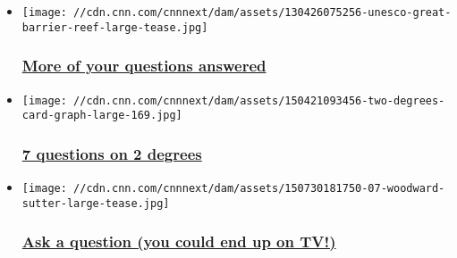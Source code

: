 \begin{itemize}
\item
  \href{/2015/09/11/opinions/your-climate-questions-two-degrees/index.html}{}

  \texttt{[image: //cdn.cnn.com/cnnnext/dam/assets/130426075256-unesco-great-barrier-reef-large-tease.jpg]}

  \hypertarget{more-of-your-questions-answered}{%
  \subsubsection{\texorpdfstring{\href{/2015/09/11/opinions/your-climate-questions-two-degrees/index.html}{More
  of your questions
  answered}}{More of your questions answered}}\label{more-of-your-questions-answered}}
\end{itemize}

\begin{itemize}
\item
  \href{/2015/04/24/opinions/sutter-questions-two-degrees-climate/index.html}{}

  \texttt{[image: //cdn.cnn.com/cnnnext/dam/assets/150421093456-two-degrees-card-graph-large-169.jpg]}

  \hypertarget{7-questions-on-2-degrees}{%
  \subsubsection{\texorpdfstring{\href{/2015/04/24/opinions/sutter-questions-two-degrees-climate/index.html}{7
  questions on 2
  degrees}}{7 questions on 2 degrees}}\label{7-questions-on-2-degrees}}
\end{itemize}

\begin{itemize}
\item
  \href{https://docs.google.com/forms/d/1eYqTADtnGjoiHOoEk13FqgXArF0VhzQUWlrl1Wc1JQQ/viewform}{}

  \texttt{[image: //cdn.cnn.com/cnnnext/dam/assets/150730181750-07-woodward-sutter-large-tease.jpg]}

  \hypertarget{ask-a-question-you-could-end-up-on-tv}{%
  \subsubsection{\texorpdfstring{\href{https://docs.google.com/forms/d/1eYqTADtnGjoiHOoEk13FqgXArF0VhzQUWlrl1Wc1JQQ/viewform}{Ask
  a question (you could end up on
  TV!)}}{Ask a question (you could end up on TV!)}}\label{ask-a-question-you-could-end-up-on-tv}}
\end{itemize}

